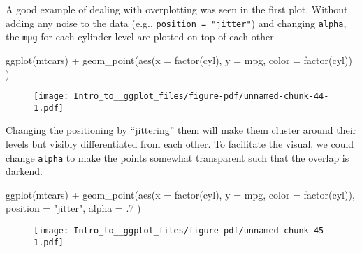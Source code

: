 \documentclass[
  letterpaper,
  DIV=11,
  numbers=noendperiod]{scrartcl}
\newenvironment{Shaded}{\begin{snugshade}}{\end{snugshade}}
\newcommand{\AttributeTok}[1]{\textcolor[rgb]{0.40,0.45,0.13}{#1}}
\newcommand{\DecValTok}[1]{\textcolor[rgb]{0.68,0.00,0.00}{#1}}
\newcommand{\FunctionTok}[1]{\textcolor[rgb]{0.28,0.35,0.67}{#1}}
\newcommand{\NormalTok}[1]{\textcolor[rgb]{0.00,0.23,0.31}{#1}}
\newcommand{\SpecialCharTok}[1]{\textcolor[rgb]{0.37,0.37,0.37}{#1}}
\newcommand{\StringTok}[1]{\textcolor[rgb]{0.13,0.47,0.30}{#1}}
\begin{document}
A good example of dealing with overplotting was seen in the first plot.
Without adding any noise to the data (e.g.,
\texttt{position\ =\ "jitter"}) and changing \texttt{alpha}, the
\texttt{mpg} for each cylinder level are plotted on top of each other

\begin{Shaded}
\begin{Highlighting}[]
\FunctionTok{ggplot}\NormalTok{(mtcars) }\SpecialCharTok{+}
  \FunctionTok{geom\_point}\NormalTok{(}\FunctionTok{aes}\NormalTok{(}\AttributeTok{x =} \FunctionTok{factor}\NormalTok{(cyl), }
                 \AttributeTok{y =}\NormalTok{ mpg, }
                 \AttributeTok{color =} \FunctionTok{factor}\NormalTok{(cyl))}
\NormalTok{             )}
\end{Highlighting}
\end{Shaded}

\begin{figure}[H]

{\centering \texttt{[image: Intro\_to\_\_ggplot\_files/figure-pdf/unnamed-chunk-44-1.pdf]}

}

\end{figure}

Changing the positioning by ``jittering'' them will make them cluster
around their levels but visibly differentiated from each other. To
facilitate the visual, we could change \texttt{alpha} to make the points
somewhat transparent such that the overlap is darkend.

\begin{Shaded}
\begin{Highlighting}[]
\FunctionTok{ggplot}\NormalTok{(mtcars) }\SpecialCharTok{+}
  \FunctionTok{geom\_point}\NormalTok{(}\FunctionTok{aes}\NormalTok{(}\AttributeTok{x =} \FunctionTok{factor}\NormalTok{(cyl), }
                 \AttributeTok{y =}\NormalTok{ mpg, }
                 \AttributeTok{color =} \FunctionTok{factor}\NormalTok{(cyl)),}
             \AttributeTok{position =} \StringTok{"jitter"}\NormalTok{, }
             \AttributeTok{alpha =}\NormalTok{ .}\DecValTok{7}
\NormalTok{             ) }
\end{Highlighting}
\end{Shaded}

\begin{figure}[H]

{\centering \texttt{[image: Intro\_to\_\_ggplot\_files/figure-pdf/unnamed-chunk-45-1.pdf]}

}

\end{figure}
\end{document}
